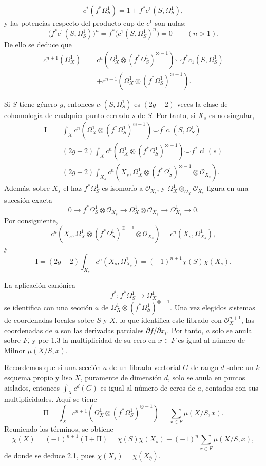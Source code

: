 \pageoriginale

\[
c^*(f^*\Omega_S^1)=1+f^*c^1(S,\Omega_S^1),
\]
y las potencias respecto del producto cup de $c^1$ son nulas:
\[
\bigl(f^*c^1(S,\Omega_S^1)\bigr)^n
=f^*\bigl(c^1(S,\Omega_S^1)^n\bigr)=0
\qquad(n>1).
\]
De ello se deduce que
\begin{align*}
c^{n+1}(\Omega_X^1)
={}&c^n\!\left(\Omega_X^1\otimes
(f^*\Omega_S^1)^{\otimes-1}\right)
\smile f^*c_1(S,\Omega_S^1)\\
&+c^{n+1}\!\left(\Omega_X^1\otimes
(f^*\Omega_S^1)^{\otimes-1}\right).
\end{align*}

Si $S$ tiene género $g$, entonces $c_1(S,\Omega_S^1)$ es
$(2g-2)$ veces la clase de cohomología de cualquier punto cerrado
$s$ de $S$. Por tanto, si $X_s$ es no singular,
\begin{align*}
\mathrm I
&=\int_Xc^n\!\left(\Omega_X^1\otimes
(f^*\Omega_S^1)^{\otimes-1}\right)
\smile f^*c_1(S,\Omega_S^1)\\
&=(2g-2)\int_Xc^n\!\left(\Omega_X^1\otimes
(f^*\Omega_S^1)^{\otimes-1}\right)
\smile f^*\operatorname{cl}(s)\\
&=(2g-2)\int_{X_s}c^n\!\left(
X_s,\Omega_X^1\otimes(f^*\Omega_S^1)^{\otimes-1}
\otimes\mathcal O_{X_s}\right).
\end{align*}
Además, sobre $X_s$ el haz $f^*\Omega_S^1$ es isomorfo a
$\mathcal O_{X_s}$, y
$\Omega_X^1\otimes_{\mathcal O_X}\mathcal O_{X_s}$ figura en una
sucesión exacta
\[
0\longrightarrow f^*\Omega_S^1\otimes\mathcal O_{X_s}
\longrightarrow\Omega_X^1\otimes\mathcal O_{X_s}
\longrightarrow\Omega_{X_s}^1\longrightarrow0.
\]
Por consiguiente,
\[
c^n\!\left(X_s,\Omega_X^1\otimes
(f^*\Omega_S^1)^{\otimes-1}\otimes\mathcal O_{X_s}\right)
=c^n(X_s,\Omega_{X_s}^1),
\]
y
\[
\mathrm I=(2g-2)\int_{X_s}c^n(X_s,\Omega_{X_s}^1)
=(-1)^{n+1}\chi(S)\chi(X_s).
\]

\pageoriginale

La aplicación canónica
\[
f^*:f^*\Omega_S^1\longrightarrow\Omega_X^1
\]
se identifica con una sección $a$ de
$\Omega_X^1\otimes(f^*\Omega_S^1)^{\otimes-1}$. Una vez elegidos
sistemas de coordenadas locales sobre $S$ y $X$, lo que identifica
este fibrado con $\mathcal O_X^{n+1}$, las coordenadas de $a$ son las
derivadas parciales $\partial f/\partial x_i$. Por tanto, $a$ solo se
anula sobre $F$, y por 1.3 la multiplicidad de su cero en $x\in F$ es
igual al número de Milnor $\mu(X/S,x)$.

Recordemos que si una sección $a$ de un fibrado vectorial $G$ de rango
$d$ sobre un $k$-esquema propio y liso $X$, puramente de dimensión
$d$, solo se anula en puntos aislados, entonces
$\int_Xc^d(G)$ es igual al número de ceros de $a$, contados con sus
multiplicidades. Aquí se tiene
\[
\mathrm{II}=\int_Xc^{n+1}\!\left(
\Omega_X^1\otimes(f^*\Omega_S^1)^{\otimes-1}\right)
=\sum_{x\in F}\mu(X/S,x).
\]
Reuniendo los términos, se obtiene
\[
\chi(X)=(-1)^{n+1}(\mathrm I+\mathrm{II})
=\chi(S)\chi(X_s)-(-1)^n\sum_{x\in F}\mu(X/S,x),
\]
de donde se deduce 2.1, pues
$\chi(X_s)=\chi(X_{\bar\eta})$.


